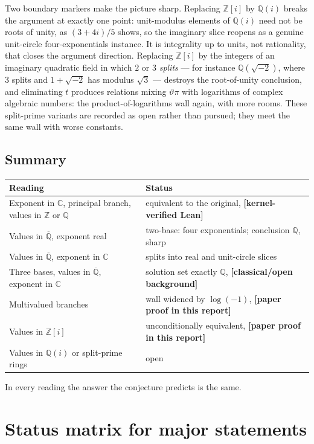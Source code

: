 \documentclass[11pt,oneside]{article}
\theoremstyle{definition}
\theoremstyle{remark}
\newcommand{\Z}{\mathbb Z}
\newcommand{\Q}{\mathbb Q}
\newcommand{\C}{\mathbb C}
\newcommand{\Abar}{\overline{\mathbb Q}}
\newcommand{\thetaq}{\vartheta}
\newcommand{\Qbar}{\Abar}
\newcommand{\statuslean}{\textcolor{leanblue}{\textbf{[kernel-verified Lean]}}}
\newcommand{\statusnew}{\textcolor{newgreen}{\textbf{[paper proof in this report]}}}
\newcommand{\statusknown}{\textcolor{classicalgray}{\textbf{[classical/\allowbreak open background]}}}
\begin{document}
Two boundary markers make the picture sharp.  Replacing $\Z[i]$ by $\Q(i)$ breaks the argument
at exactly one point: unit-modulus elements of $\Q(i)$ need not be roots of unity, as
$(3+4i)/5$ shows, so the imaginary slice reopens as a genuine unit-circle four-exponentials
instance.  It is integrality up to units, not rationality, that closes the argument direction.
Replacing $\Z[i]$ by the integers of an imaginary quadratic field in which $2$ or $3$
\emph{splits} --- for instance $\Q(\sqrt{-2})$, where $3$ splits and $1+\sqrt{-2}$ has modulus
$\sqrt3$ --- destroys the root-of-unity conclusion, and eliminating $t$ produces relations
mixing $\thetaq\pi$ with logarithms of complex algebraic numbers: the product-of-logarithms
wall again, with more rooms.  These split-prime variants are recorded as open rather than
pursued; they meet the same wall with worse constants.

\subsection{Summary}

\begin{center}
\begin{tabularx}{\textwidth}{@{}>{\raggedright\arraybackslash}p{}>{\raggedright\arraybackslash}X@{}}
\toprule
Reading & Status \\
\midrule
Exponent in $\C$, principal branch, values in $\Z$ or $\Q$ &
equivalent to the original, \statuslean \\
Values in $\Qbar$, exponent real & two-base: four exponentials; conclusion $\Q$, sharp \\
Values in $\Qbar$, exponent in $\C$ & splits into real and unit-circle slices \\
Three bases, values in $\Qbar$, exponent in $\C$ & solution set exactly $\Q$, \statusknown \\
Multivalued branches & wall widened by $\log(-1)$, \statusnew \\
Values in $\Z[i]$ & unconditionally equivalent, \statusnew \\
Values in $\Q(i)$ or split-prime rings & open \\
\bottomrule
\end{tabularx}
\end{center}

In every reading the answer the conjecture predicts is the same.

\appendix

\section{Status matrix for major statements}
\label{app:status}
\end{document}
